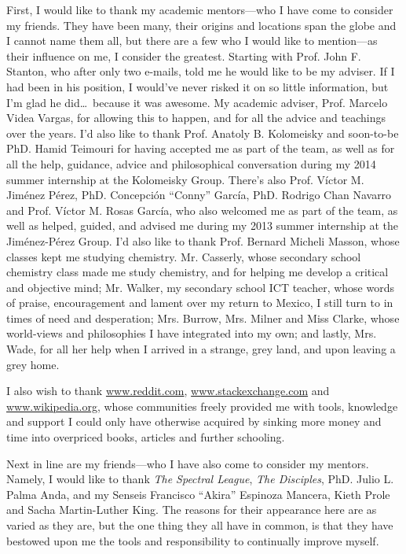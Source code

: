 \documentclass[12pt]{report}      %
\begin{document}
	First, I would like to thank my academic mentors---who I have come to consider my friends. They have been many, their origins and locations span the globe and I cannot name them all, but there are a few who I would like to mention---as their influence on me, I consider the greatest. Starting with Prof. John F. Stanton, who after only two e-mails, told me he would like to be my adviser. If I had been in his position, I would've never risked it on so little information, but I'm glad he did\dots~because it was awesome. My academic adviser, Prof. Marcelo Videa Vargas, for allowing this to happen, and for all the advice and teachings over the years. I'd also like to thank Prof. Anatoly B. Kolomeisky and soon-to-be PhD. Hamid Teimouri for having accepted me as part of the team, as well as for all the help, guidance, advice and philosophical conversation during my 2014 summer internship at the Kolomeisky Group. There's also Prof. Víctor M. Jiménez Pérez, PhD. Concepción ``Conny'' García, PhD. Rodrigo Chan Navarro and Prof. Víctor M. Rosas García, who also welcomed me as part of the team, as well as helped, guided, and advised me during my 2013 summer internship at the Jiménez-Pérez Group. I'd also like to thank Prof. Bernard Micheli Masson, whose classes kept me studying chemistry. Mr. Casserly, whose secondary school chemistry class made me study chemistry, and for helping me develop a critical and objective mind; Mr. Walker, my secondary school ICT teacher, whose words of praise, encouragement and lament over my return to Mexico, I still turn to in times of need and desperation; Mrs. Burrow, Mrs. Milner and Miss Clarke, whose world-views and philosophies I have integrated into my own; and lastly, Mrs. Wade, for all her help when I arrived in a strange, grey land, and upon leaving a grey home.
	
	I also wish to thank \url{www.reddit.com}, \url{www.stackexchange.com} and \url{www.wikipedia.org}, whose communities freely provided me with tools, knowledge and support I could only have otherwise acquired by sinking more money and time into overpriced books, articles and further schooling.
	
	Next in line are my friends---who I have also come to consider my mentors. Namely, I would like to thank \emph{The Spectral League}, \emph{The Disciples}, PhD. Julio L. Palma Anda, and my Senseis Francisco ``Akira'' Espinoza Mancera, Kieth Prole and Sacha Martin-Luther King. The reasons for their appearance here are as varied as they are, but the one thing they all have in common, is that they have bestowed upon me the tools and responsibility to continually improve myself.
	
\end{document}

